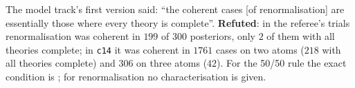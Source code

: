 \begin{remark}\label{rem:sound:completeref}
The model track's first version said: ``the coherent cases [of renormalisation] are essentially those where every theory is complete''. \textbf{Refuted}: in the referee's trials renormalisation was coherent in $199$ of $300$ posteriors, only $2$ of them with all theories complete; in \texttt{c14} it was coherent in $1761$ cases on two atoms ($218$ with all theories complete) and $306$ on three atoms ($42$). For the 50/50 rule the exact condition is ; for renormalisation no characterisation is given.
\end{remark}
